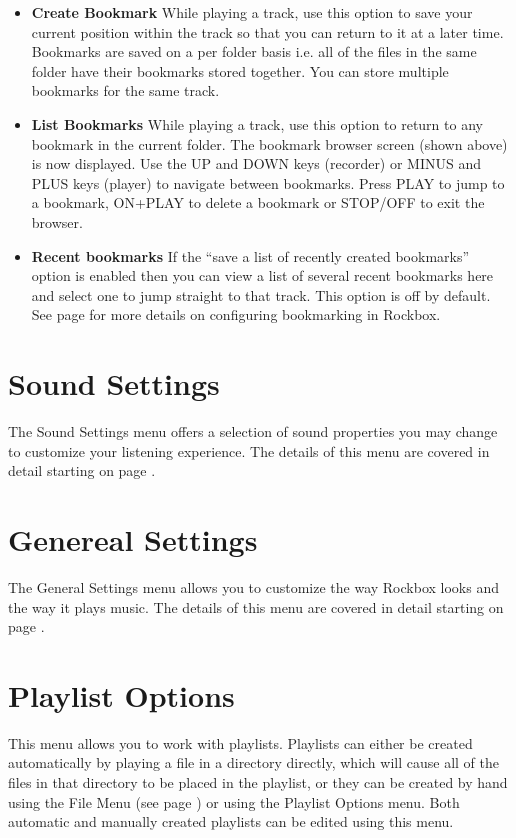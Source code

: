 \begin{itemize}
  
\item \textbf{Create Bookmark}
  While playing a track, use this option to save your current position within the track so that you can return to it at a later time.  Bookmarks are saved on a per folder basis i.e. all of the files in the same folder have their bookmarks stored together. You can store multiple bookmarks for the same track.
  
\item \textbf{List Bookmarks}
  While playing a track, use this option to return to any bookmark in the current folder.  The bookmark browser screen (shown above) is now displayed.  Use the UP and DOWN keys (recorder) or MINUS and PLUS keys (player) to navigate between bookmarks.  Press PLAY to jump to a bookmark, ON+PLAY to delete a bookmark or STOP/OFF to exit the browser.
  
\item \textbf {Recent bookmarks}
  If the ``save a list of recently created bookmarks'' option is enabled then you can view a list of several recent bookmarks here and select one to jump straight to that track.  This option is off by default. See page \pageref{ref:Bookmarkconfigactual} for more details on configuring bookmarking in Rockbox.
\end{itemize}

\section{Sound Settings}
	The Sound Settings menu offers a selection of sound properties you may change to customize your listening experience.  The details of this menu are covered in detail starting on page \pageref{ref:configure_rockbox_sound}. 

\section{Genereal Settings}
 	The General Settings menu allows you to customize the way Rockbox looks and the way it plays music.  The details of this menu are covered in detail starting on page \pageref{ref:configure_rockbox_general}. 
 
\section{\label{ref:playlistoptions}Playlist Options}
This menu allows you to work with playlists. Playlists can either be created automatically by playing a file in a directory directly, which will cause all of the files in that directory to be placed in the playlist, or they can be created by hand using the File Menu (see page \pageref{ref:Filemenu}) or using the Playlist Options menu.  Both  automatic and manually created playlists can be edited using this menu.

